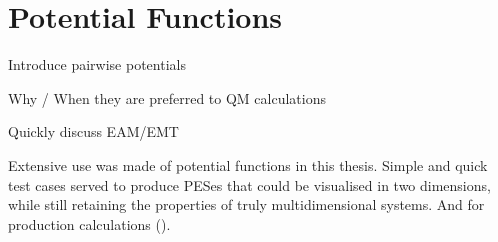 \section{Potential Functions \pending}
\label{sec:potentials}

\bit
\item Introduce pairwise potentials
\item Why / When they are preferred to QM calculations
\item Quickly discuss EAM/EMT
\eit

Extensive use was made of potential functions in this thesis.
Simple and quick test cases served to produce PESes that could be visualised in two dimensions, while still retaining the properties of truly multidimensional systems.
And for production calculations ().

